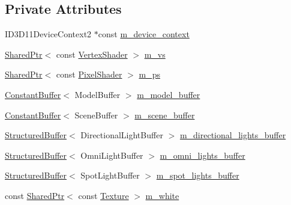 \subsection*{Private Attributes}
\begin{DoxyCompactItemize}
\item 
I\+D3\+D11\+Device\+Context2 $\ast$const \hyperlink{classmage_1_1_constant_shading_pass_a743bb9ce4f40514498f36c2d4cf0b32c}{m\+\_\+device\+\_\+context}
\item 
\hyperlink{namespacemage_a1e01ae66713838a7a67d30e44c67703e}{Shared\+Ptr}$<$ const \hyperlink{classmage_1_1_vertex_shader}{Vertex\+Shader} $>$ \hyperlink{classmage_1_1_constant_shading_pass_a3dc25d352bc4b9dcf9b06993e2e46c62}{m\+\_\+vs}
\item 
\hyperlink{namespacemage_a1e01ae66713838a7a67d30e44c67703e}{Shared\+Ptr}$<$ const \hyperlink{namespacemage_ac98506b7edd999ea43ec46fbd0330238}{Pixel\+Shader} $>$ \hyperlink{classmage_1_1_constant_shading_pass_aa7768c70069825ef231bcaa1cba15263}{m\+\_\+ps}
\item 
\hyperlink{structmage_1_1_constant_buffer}{Constant\+Buffer}$<$ Model\+Buffer $>$ \hyperlink{classmage_1_1_constant_shading_pass_ae828b9ae1e4cd281f346aca0db34c015}{m\+\_\+model\+\_\+buffer}
\item 
\hyperlink{structmage_1_1_constant_buffer}{Constant\+Buffer}$<$ Scene\+Buffer $>$ \hyperlink{classmage_1_1_constant_shading_pass_a90b8b9d41ed31cf1a60d5e8949fee781}{m\+\_\+scene\+\_\+buffer}
\item 
\hyperlink{structmage_1_1_structured_buffer}{Structured\+Buffer}$<$ Directional\+Light\+Buffer $>$ \hyperlink{classmage_1_1_constant_shading_pass_aa4851a004cdbb4f30bfdb3f48cd62bca}{m\+\_\+directional\+\_\+lights\+\_\+buffer}
\item 
\hyperlink{structmage_1_1_structured_buffer}{Structured\+Buffer}$<$ Omni\+Light\+Buffer $>$ \hyperlink{classmage_1_1_constant_shading_pass_a6223b4fc31add5a57e9cc7f9d6d4ef60}{m\+\_\+omni\+\_\+lights\+\_\+buffer}
\item 
\hyperlink{structmage_1_1_structured_buffer}{Structured\+Buffer}$<$ Spot\+Light\+Buffer $>$ \hyperlink{classmage_1_1_constant_shading_pass_ac65e692c0503240ce29aabd0f7a29b9d}{m\+\_\+spot\+\_\+lights\+\_\+buffer}
\item 
const \hyperlink{namespacemage_a1e01ae66713838a7a67d30e44c67703e}{Shared\+Ptr}$<$ const \hyperlink{classmage_1_1_texture}{Texture} $>$ \hyperlink{classmage_1_1_constant_shading_pass_aa5c9222b0de16e351b90752150d584d1}{m\+\_\+white}
\end{DoxyCompactItemize}


